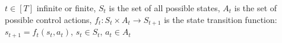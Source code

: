 
\begin{deff} $t \in [T]$ infinite or finite, $S_t$ is the set of all possible states, $A_t$ is the set of possible control actions, $f_t : S_t \times A_t \rightarrow S_{t+1}$ is the state transition function: $s_{t+1} = f_t(s_t, a_t)$, $s_t \in S_t$, $a_t \in A_t$ \end{deff}
